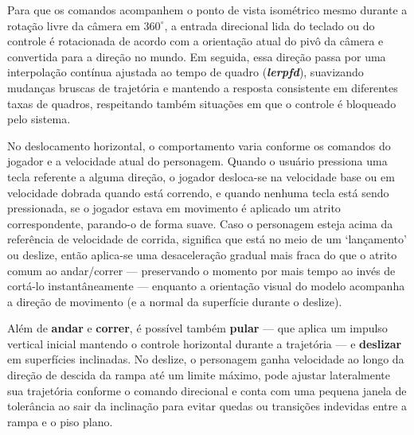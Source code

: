 Para que os comandos acompanhem o ponto de vista isométrico mesmo durante a rotação livre da
câmera em {\boldmath $360^\circ$}, a entrada direcional lida do teclado ou do controle é
rotacionada de acordo com a orientação atual do pivô da câmera e convertida para a direção no
mundo. Em seguida, essa direção passa por uma interpolação contínua ajustada ao tempo de quadro
(\textbf{\textit{lerpfd}}), suavizando mudanças bruscas de trajetória e mantendo a resposta
consistente em diferentes taxas de quadros, respeitando também situações em que o controle é
bloqueado pelo sistema.


No deslocamento horizontal, o comportamento varia conforme os comandos do jogador e a velocidade
atual do personagem. Quando o usuário pressiona uma tecla referente a alguma direção,
o jogador desloca-se na velocidade base ou em velocidade dobrada quando está correndo, e quando nenhuma tecla
está sendo pressionada, se o jogador estava em movimento é aplicado um atrito correspondente, parando-o de forma suave.
Caso o personagem esteja acima da referência de velocidade de corrida, significa que está no meio de um
`lançamento' ou deslize, então aplica-se uma desaceleração gradual mais fraca do que o atrito comum ao andar/correr ---
preservando o momento por mais tempo ao invés de cortá-lo instantâneamente --- enquanto a orientação
visual do modelo acompanha a direção de movimento (e a normal da superfície durante o deslize).

Além de \textbf{andar} e \textbf{correr}, é possível também \textbf{pular} --- que aplica um impulso vertical
inicial mantendo o controle horizontal durante a trajetória --- e \textbf{deslizar} em superfícies
inclinadas. No deslize, o personagem ganha velocidade ao longo da direção de descida da rampa até
um limite máximo, pode ajustar lateralmente sua trajetória conforme o comando direcional e conta
com uma pequena janela de tolerância ao sair da inclinação para evitar quedas ou transições
indevidas entre a rampa e o piso plano.
